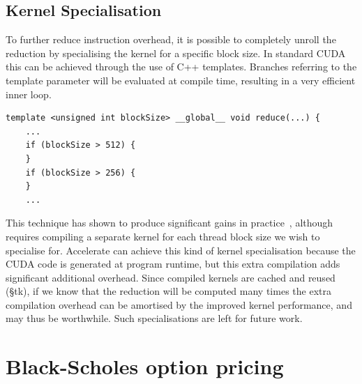 \subsection{Kernel Specialisation}

To further reduce instruction overhead, it is possible to completely unroll the
reduction by specialising the kernel for a specific block size. In standard CUDA
this can be achieved through the use of C++ templates. Branches referring to the
template parameter will be evaluated at compile time, resulting in a very
efficient inner loop.
%
\begin{lstlisting}[style=cuda]
template <unsigned int blockSize> __global__ void reduce(...) {
    ...
    if (blockSize > 512) {
    }
    if (blockSize > 256) {
    }
    ...
\end{lstlisting}

This technique has shown to produce significant gains in
practice~\cite{Harris:2007te}, although requires compiling a separate kernel for
each thread block size we wish to specialise for. Accelerate can achieve this
kind of kernel specialisation because the CUDA code is generated at program
runtime, but this extra compilation adds significant additional overhead. Since
compiled kernels are cached and reused (\S tk), if we know that the reduction
will be computed many times the extra compilation overhead can be amortised by
the improved kernel performance, and may thus be worthwhile. Such
specialisations are left for future work.


\section{Black-Scholes option pricing}

